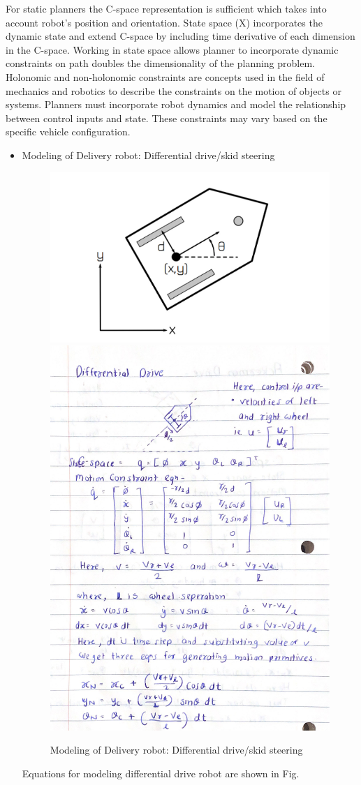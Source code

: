 \documentclass[12pt,a4paper]{article}
\begin{document}
For static planners the C-space representation is sufficient which takes into account robot's position and orientation. State space (X) incorporates the dynamic state and extend C-space by including time derivative of each dimension in the C-space. 
Working in state space allows planner to incorporate dynamic constraints on path doubles the dimensionality of the planning problem. Holonomic and non-holonomic constraints are concepts used in the field of mechanics and robotics to describe the constraints on the motion of objects or systems. Planners must incorporate robot dynamics and model the relationship between control inputs and state. These constraints may vary based on the specific vehicle configuration.
\begin{itemize}
    \item Modeling of Delivery robot: Differential drive/skid steering \par
        \begin{figure}[htbp!]
        \begin{center}
        \includegraphics[width=0.4\columnwidth]{images/model_diffdrive.jpeg}         
        \includegraphics[width=0.4\columnwidth]{algorithm/diffbot_model.png}
        \end{center}
        \caption{Modeling of Delivery robot: Differential drive/skid steering}
        \label{fig:model_diffdrive}
        \end{figure}
        Equations for modeling differential drive robot are shown in Fig.\par

\end{itemize}
\end{document}
